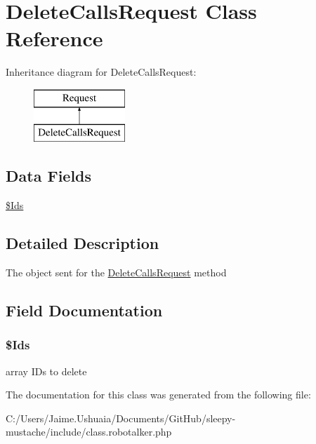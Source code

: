 \hypertarget{class_delete_calls_request}{\section{Delete\-Calls\-Request Class Reference}
\label{class_delete_calls_request}
}
Inheritance diagram for Delete\-Calls\-Request\-:\begin{figure}[H]
\begin{center}
\leavevmode
\includegraphics[height=2.000000cm]{class_delete_calls_request}
\end{center}
\end{figure}
\subsection*{Data Fields}
\begin{DoxyCompactItemize}
\item 
\hyperlink{class_delete_calls_request_a003384fac9231dcb79d5719b16e9eed8}{\$\-Ids}
\end{DoxyCompactItemize}


\subsection{Detailed Description}
The object sent for the \hyperlink{class_delete_calls_request}{Delete\-Calls\-Request} method 

\subsection{Field Documentation}
\hypertarget{class_delete_calls_request_a003384fac9231dcb79d5719b16e9eed8}{
\subsubsection[{\$\-Ids}]{\setlength{\rightskip}{0pt plus 5cm}\$Ids}}\label{class_delete_calls_request_a003384fac9231dcb79d5719b16e9eed8}
array I\-Ds to delete 

The documentation for this class was generated from the following file\-:\begin{DoxyCompactItemize}
\item 
C\-:/\-Users/\-Jaime.\-Ushuaia/\-Documents/\-Git\-Hub/sleepy-\/mustache/include/class.\-robotalker.\-php\end{DoxyCompactItemize}

